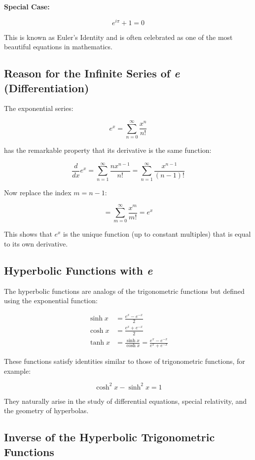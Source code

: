 \textbf{Special Case:}

\[
    e^{i\pi} + 1 = 0
\]

This is known as Euler's Identity and is often celebrated as one of the most beautiful equations in 
mathematics.

\subsection{Reason for the Infinite Series of \texorpdfstring{\emph{e}}{e} (Differentiation)}

The exponential series:

\[
    e^x = \sum_{n=0}^{\infty} \frac{x^n}{n!}
\]

has the remarkable property that its derivative is the same function:

\[
    \frac{d}{dx} e^x = \sum_{n=1}^{\infty} \frac{n x^{n-1}}{n!} = \sum_{n=1}^{\infty} \frac{x^{n-1}}{(n-1)!}
\]

Now replace the index \(m = n - 1\):

\[
    = \sum_{m=0}^{\infty} \frac{x^m}{m!} = e^x
\]

This shows that \(e^x\) is the unique function (up to constant multiples) that is equal to its own 
derivative.

\subsection{Hyperbolic Functions with \texorpdfstring{\emph{e}}{e}}

The hyperbolic functions are analogs of the trigonometric functions but defined using the exponential 
function:

\begin{align*}
    \sinh x &= \frac{e^x - e^{-x}}{2} \\
    \cosh x &= \frac{e^x + e^{-x}}{2} \\
    \tanh x &= \frac{\sinh x}{\cosh x} = \frac{e^x - e^{-x}}{e^x + e^{-x}}
\end{align*}

These functions satisfy identities similar to those of trigonometric functions, for example:

\[
    \cosh^2 x - \sinh^2 x = 1
\]

They naturally arise in the study of differential equations, special relativity, and the 
geometry of hyperbolas.

\subsection{Inverse of the Hyperbolic Trigonometric Functions}


